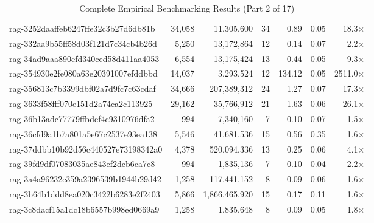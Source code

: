 \begin{table}[h!]
\begin{tabular}{lrrrrrr}
rag-3252daaffeb6247ffe32c3b27d6db81b & 34,058 & 11,305,600 & 34 & 0.89 & 0.05 & 18.3$\times$ \\
rag-332aa9b55ff58d03f121d7c34cb4b26d & 5,250 & 13,172,864 & 12 & 0.14 & 0.07 & 2.2$\times$ \\
rag-34ad9aaa890efd340ced58d411aa4053 & 6,554 & 13,175,424 & 13 & 0.44 & 0.05 & 9.3$\times$ \\
rag-354930e2fe080a63e20391007efddbbd & 14,037 & 3,293,524 & 12 & 134.12 & 0.05 & 2511.0$\times$ \\
rag-356813c7b3399dbf02a7d9fc7c63cdaf & 34,666 & 207,389,312 & 24 & 1.27 & 0.07 & 17.3$\times$ \\
rag-3633f58fff070e151d2a74ca2c113925 & 29,162 & 35,766,912 & 21 & 1.63 & 0.06 & 26.1$\times$ \\
rag-36b13adc77779ffbdef4c9310976dfa2 & 994 & 7,340,160 & 7 & 0.10 & 0.07 & 1.5$\times$ \\
rag-36cfd9a1b7a801a5e67c2537e93ea138 & 5,546 & 41,681,536 & 15 & 0.56 & 0.35 & 1.6$\times$ \\
rag-37ddbb10b92d56c440527e73198342a0 & 4,378 & 520,094,336 & 13 & 0.25 & 0.06 & 4.1$\times$ \\
rag-39fd9df07083035ae843ef2dcb6ca7c8 & 994 & 1,835,136 & 7 & 0.10 & 0.04 & 2.2$\times$ \\
rag-3a4a96232c359a2396539b1944b29d42 & 1,258 & 117,441,152 & 8 & 0.09 & 0.06 & 1.6$\times$ \\
rag-3b64b1ddd8ea020c3422b6283e2f2403 & 5,866 & 1,866,465,920 & 15 & 0.17 & 0.11 & 1.6$\times$ \\
rag-3c8dacf15a1dc18b6557b998ed0669a9 & 1,258 & 1,835,648 & 8 & 0.09 & 0.05 & 1.8$\times$ \\
\bottomrule
\end{tabular}
\caption{Complete Empirical Benchmarking Results (Part 2 of 17)}
\end{table}

\clearpage

